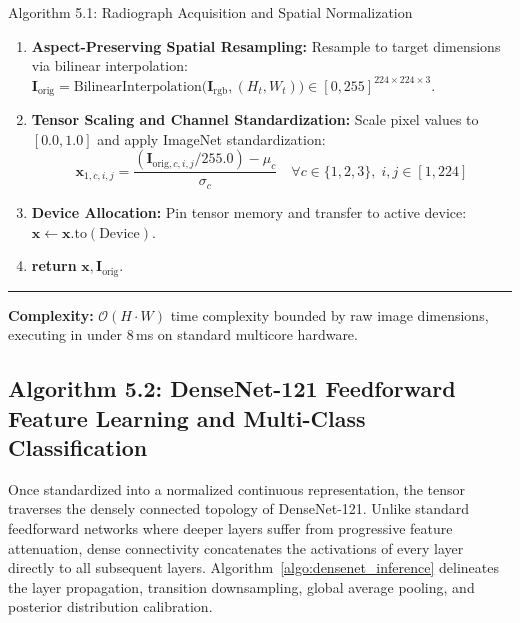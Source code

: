 \documentclass[12pt,a4paper]{report}
\begin{document}
\begin{algoBox}{Algorithm 5.1: Radiograph Acquisition and Spatial Normalization}
\begin{enumerate}[1:]
\begin{equation*}
\begin{cases}
      \end{cases}
    \end{equation*}
  \item \textbf{Aspect-Preserving Spatial Resampling:} Resample to target dimensions via bilinear interpolation: $\mathbf{I}_{\text{orig}} = \mathrm{BilinearInterpolation}\big(\mathbf{I}_{\text{rgb}}, (H_t, W_t)\big) \in [0, 255]^{224 \times 224 \times 3}$.
  \item \textbf{Tensor Scaling and Channel Standardization:} Scale pixel values to $[0.0, 1.0]$ and apply ImageNet standardization:
    \begin{equation*}
      \mathbf{x}_{1, c, i, j} = \frac{(\mathbf{I}_{\text{orig}, c, i, j} / 255.0) - \mu_c}{\sigma_c} \quad \forall c \in \{1, 2, 3\}, \; i, j \in [1, 224]
    \end{equation*}
  \item \textbf{Device Allocation:} Pin tensor memory and transfer to active device: $\mathbf{x} \leftarrow \mathbf{x}.\mathrm{to}(\mathrm{Device})$.
  \item \textbf{return} $\mathbf{x}, \mathbf{I}_{\text{orig}}$.
\end{enumerate}
\noindent\rule{\linewidth}{0.4pt}
\textbf{Complexity:} $\mathcal{O}(H \cdot W)$ time complexity bounded by raw image dimensions, executing in under 8\,ms on standard multicore hardware.
\end{algoBox}

\subsection{Algorithm 5.2: DenseNet-121 Feedforward Feature Learning and Multi-Class Classification}
Once standardized into a normalized continuous representation, the tensor traverses the densely connected topology of DenseNet-121. Unlike standard feedforward networks where deeper layers suffer from progressive feature attenuation, dense connectivity concatenates the activations of every layer directly to all subsequent layers. Algorithm~\ref{algo:densenet_inference} delineates the layer propagation, transition downsampling, global average pooling, and posterior distribution calibration.
\end{document}

